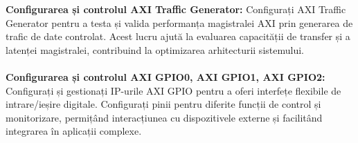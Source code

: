 \documentclass[12pt]{article}
\begin{document}
\hspace*{1cm}\textbf{Configurarea și controlul AXI Traffic Generator:} Configurați AXI Traffic Generator pentru a testa și valida performanța magistralei AXI prin generarea de trafic de date controlat. Acest lucru ajută la evaluarea capacității de transfer și a latenței magistralei, contribuind la optimizarea arhitecturii sistemului.\\\\
\hspace*{1cm}\textbf{Configurarea și controlul AXI GPIO0, AXI GPIO1, AXI GPIO2:} Configurați și gestionați IP-urile AXI GPIO pentru a oferi interfețe flexibile de intrare/ieșire digitale. Configurați pinii pentru diferite funcții de control și monitorizare, permițând interacțiunea cu dispozitivele externe și facilitând integrarea în aplicații complexe.\\\\
\end{document}
